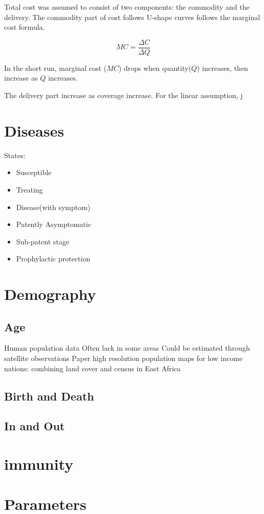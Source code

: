 \documentclass[a4paper, 12pt, twoside]{article}
\begin{document}
Total cost was assumed to consist of two components: the commodity and the delivery. The commodity part of cost follows U-shape curves follows the marginal cost formula.

$$ MC = \frac{\Delta C}{\Delta Q} $$

In the short run, marginal cost ($MC$) drops when quantity($Q$) increases, then increase as $Q$ increases.

The delivery part increase as coverage increase. For the linear assumption, j

\section{Diseases}
States:
\begin{itemize}
	\item Susceptible
	\item Treating
	\item Disease(with symptom)
	\item Patently Asymptomatic
	\item Sub-patent stage
	\item Prophylactic protection
\end{itemize}
\section{Demography}
\subsection{Age}
Human population data
Often lack in some areas
Could be estimated through satellite observations
Paper high resolution population maps for low income nations: combining land cover and census in East Africa

\subsection{Birth and Death}
\subsection{In and Out}

\section{immunity}

\section{Parameters}

\appendix
\printglossaries
\printnomenclature


\end{document}
